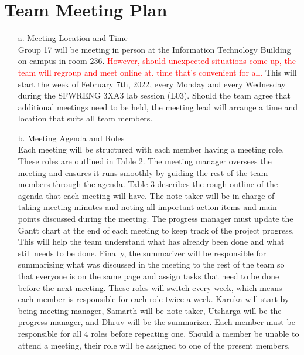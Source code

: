 \documentclass[12pt, titlepage]{article}
\begin{document}
\section{Team Meeting Plan}
\begin{itemize}
    \item[a.] Meeting Location and Time\\
		Group 17 will be meeting in person at the Information Technology Building on campus in room 236. \textcolor{red}{However, should unexpected situations come up, the team will regroup and meet online at. time that's convenient for all.} This will start the week of February 7th, 2022, \sout{every Monday and} every Wednesday during the SFWRENG 3XA3 lab session (L03). Should the team agree that additional meetings need to be held, the meeting lead will arrange a time and location that suits all team members. 
    \item[b.] Meeting Agenda and Roles\\
		Each meeting will be structured with each member having a meeting role. These roles are outlined in Table 2. The meeting manager oversees the meeting and ensures it runs smoothly by guiding the rest of the team members through the agenda. Table 3 describes the rough outline of the agenda that each meeting will have. The note taker will be in charge of taking meeting minutes and noting all important action items and main points discussed during the meeting. The progress manager must update the Gantt chart at the end of each meeting to keep track of the project progress. This will help the team understand what has already been done and what still needs to be done. Finally, the summarizer will be responsible for summarizing what was discussed in the meeting to the rest of the team so that everyone is on the same page and assign tasks that need to be done before the next meeting. These roles will switch every week, which means each member is responsible for each role twice a week. Karuka will start by being meeting manager, Samarth will be note taker, Utsharga will be the progress manager, and Dhruv will be the summarizer. Each member must be responsible for all 4 roles before repeating one. Should a member be unable to attend a meeting, their role will be assigned to one of the present members. 
\end{itemize}
\end{document}
